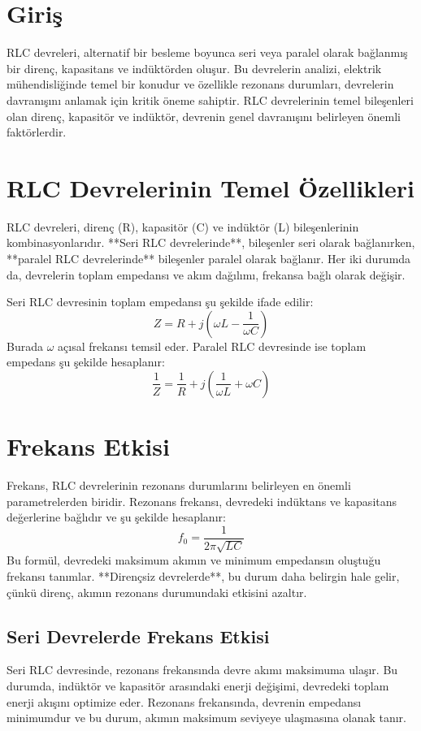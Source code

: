 \documentclass[11pt,letterpaper,twocolumn]{fenbil}
\begin{document}
\section{Giriş}
RLC devreleri, alternatif bir besleme boyunca seri veya paralel olarak bağlanmış bir direnç, kapasitans ve indüktörden oluşur. Bu devrelerin analizi, elektrik mühendisliğinde temel bir konudur ve özellikle rezonans durumları, devrelerin davranışını anlamak için kritik öneme sahiptir. RLC devrelerinin temel bileşenleri olan direnç, kapasitör ve indüktör, devrenin genel davranışını belirleyen önemli faktörlerdir.

\section{RLC Devrelerinin Temel Özellikleri}
RLC devreleri, direnç (R), kapasitör (C) ve indüktör (L) bileşenlerinin kombinasyonlarıdır. **Seri RLC devrelerinde**, bileşenler seri olarak bağlanırken, **paralel RLC devrelerinde** bileşenler paralel olarak bağlanır. Her iki durumda da, devrelerin toplam empedansı ve akım dağılımı, frekansa bağlı olarak değişir. 

Seri RLC devresinin toplam empedansı şu şekilde ifade edilir:
\begin{equation}
Z = R + j\left(\omega L - \frac{1}{\omega C}\right)
\end{equation}
Burada \( \omega \) açısal frekansı temsil eder. Paralel RLC devresinde ise toplam empedans şu şekilde hesaplanır:
\begin{equation}
\frac{1}{Z} = \frac{1}{R} + j\left(\frac{1}{\omega L} + \omega C\right)
\end{equation}

\section{Frekans Etkisi}
Frekans, RLC devrelerinin rezonans durumlarını belirleyen en önemli parametrelerden biridir. Rezonans frekansı, devredeki indüktans ve kapasitans değerlerine bağlıdır ve şu şekilde hesaplanır:
\begin{equation}
f_0 = \frac{1}{2\pi\sqrt{LC}}
\end{equation}
Bu formül, devredeki maksimum akımın ve minimum empedansın oluştuğu frekansı tanımlar. **Dirençsiz devrelerde**, bu durum daha belirgin hale gelir, çünkü direnç, akımın rezonans durumundaki etkisini azaltır.

\subsection{Seri Devrelerde Frekans Etkisi}
Seri RLC devresinde, rezonans frekansında devre akımı maksimuma ulaşır. Bu durumda, indüktör ve kapasitör arasındaki enerji değişimi, devredeki toplam enerji akışını optimize eder. Rezonans frekansında, devrenin empedansı minimumdur ve bu durum, akımın maksimum seviyeye ulaşmasına olanak tanır.
\end{document}
